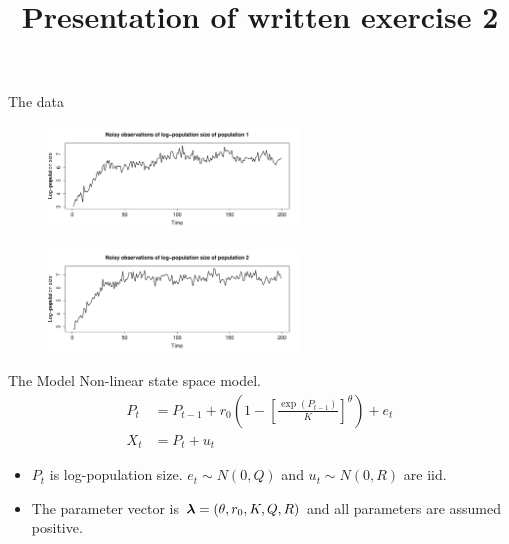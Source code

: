 

\title[Presentation of exercise 2]{Presentation of written exercise 2}


\begin{frame}
\titlepage
\end{frame}

\begin{frame}{The data}
    \begin{figure}
    \includegraphics[width=250px]{../plots/dataset-1.pdf}
    \end{figure}
    \begin{figure}
    \includegraphics[width=250px]{../plots/dataset-2.pdf}
    \end{figure}
\end{frame}

\begin{frame}{The Model}
    Non-linear state space model.
    \begin{align*}
        P_t &= P_{t-1} + r_0 \left(1 - \left[\frac{\exp{(P_{t-1})}}{K}\right]^\theta\right) + e_t \\
        X_t &= P_t + u_t
    \end{align*}
    \begin{itemize}
        \item $P_t$ is log-population size. $e_t\sim N(0, Q)$ and $u_t\sim N(0,R)$ are iid.
        \item The parameter vector is $\boldsymbol{\lambda} = (\theta, r_0, K, Q, R)$ and all parameters are assumed positive.
    \end{itemize}
\end{frame}

